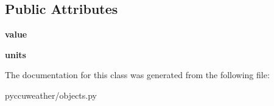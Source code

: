 \subsection*{Public Attributes}
\begin{DoxyCompactItemize}
\item 
\hypertarget{classpyccuweather_1_1objects_1_1_snow_adf35f750b34db23f908129bbdef4dc3b}{}{\bfseries value}\label{classpyccuweather_1_1objects_1_1_snow_adf35f750b34db23f908129bbdef4dc3b}

\item 
\hypertarget{classpyccuweather_1_1objects_1_1_snow_a41d2a5ab15c5d60b1e586b0e25b3d040}{}{\bfseries units}\label{classpyccuweather_1_1objects_1_1_snow_a41d2a5ab15c5d60b1e586b0e25b3d040}

\end{DoxyCompactItemize}


The documentation for this class was generated from the following file\+:\begin{DoxyCompactItemize}
\item 
pyccuweather/objects.\+py\end{DoxyCompactItemize}
